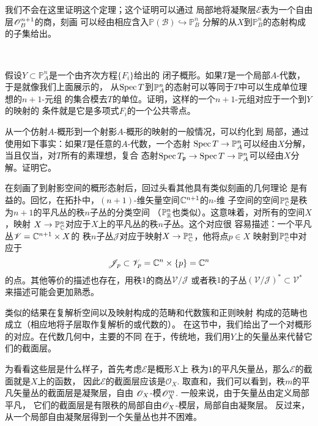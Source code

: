 我们不会在这里证明这个定理；这个证明可以通过
局部地将凝聚层$\mathscr E$表为一个自由层$\oo_B^{n+1}$的商，刻画
可以经由相应含入$\mathbb P(\mathscr B)\hookrightarrow \mathbb P_B^n$
分解的从$X$到$\mathbb P_B^n$的态射构成的子集给出。

\begin{exe}~\label{exe:3.45}
\begin{compactenum}[(a)]
\item 假设$Y\subset \mathbb P_A^n$是一个由齐次方程$\{F_i\}$给出的
闭子概形。如果$T$是一个局部$A$-代数，于是就像我们上面展示的，
从$\spec T$到$\P_A^n$的态射可以等同于$T$中可以生成单位理想的$n+1$-元组
的集合模去$T$的单位。证明，这样的一个$n+1$-元组对应于一个到$Y$的映射的
条件就是它是多项式$F_i$的一个公共零点。
\item 从一个仿射$A$-概形到一个射影$A$-概形的映射的一般情况，可以约化到
局部，通过使用如下事实：如果$T$是任意的$A$-代数，一个态射
$\spec T\to \P_A^n$可以经由$X$分解，当且仅当，对$T$所有的素理想，复合
态射$\spec T_\pp\to \spec T\to \P_A^n$可以经由$X$分解。证明它。
\end{compactenum}
\end{exe}


在刻画了到射影空间的概形态射后，回过头看其他具有类似刻画的几何理论
是有益的。回忆，在拓扑中，$(n+1)$-维矢量空间$\cc^{n+1}$的$n$-维
子空间的空间$\P^n_\cc$是秩为$n+1$的平凡丛的秩$n$子丛的分类空间
（$\P_{\mathbb R}^n$也类似）。这意味着，对所有的空间$X$，映射
$X\to \mathbb P_\cc^n$对应于$X$上的平凡丛的秩$n$子丛。这个对应很
容易描述：一个平凡丛$\mathscr V=\cc^{n+1}\times X$的
秩$n$子丛$\mathscr J$对应于映射$X\to \P_\cc^n$，他将点$p\in X$
映射到$\mathbb P_\cc^n$中对应于
\[
	\mathscr J_p\subset \mathscr V_p=\cc^n\times \{p\}=\cc^n
\]
的点。其他等价的描述也存在，用秩$1$的商丛$\mathscr V/\mathscr J$
或者秩$1$的子丛$(\mathscr V/\mathscr J)^*\subset \mathscr V^*$
来描述可能会更加熟悉。

类似的结果在复解析空间以及映射构成的范畴和代数簇和正则映射
构成的范畴也成立（相应地将子层取作复解析的或代数的）。
在这节中，我们给出了一个对概形的对应。在代数几何中，主要的不同
在于，传统地，我们用$Y$上的矢量丛来代替它们的截面层。

为看看这些层是什么样子，首先考虑$\mathscr E$是概形$X$上
秩为$1$的平凡矢量丛，那么$\mathscr E$的截面就是$X$上的函数，
因此$\mathscr E$的截面层应该是$\mathscr O_X$.
取直和，我们可以看到，秩$m$的平凡矢量丛的截面层是凝聚层，自由
$\oo_X$-模$\oo_X^m$. 一般来说，由于矢量丛由定义局部平凡，
它们的截面层是有限秩的局部自由$\oo_X$-模层，局部自由凝聚层。
反过来，从一个局部自由凝聚层得到一个矢量丛也并不困难。

